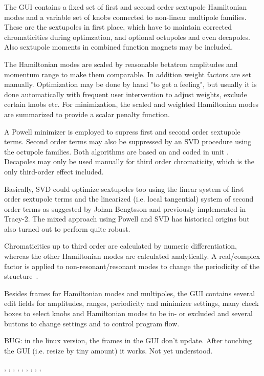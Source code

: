 \documentclass[12pt]{article}
\newcommand\code[1]{{\tt #1}}
\newcommand{\opagui}[1]{\colorbox{blue!20}{{\color{black}\code{#1}}}}
\newcommand{\ogui}[1]{\hyperref[#1]{\opagui{#1}}}
\newcommand{\opaguif}[1]{\colorbox{violet!30}{{\color{black}\code{#1}}}}
\newcommand{\oguif}[1]{\hyperref[#1]{\opaguif{#1}}}
\newcommand{\opauni}[1]{\colorbox{orange!30}{{\color{black}\code{#1}}}}
\newcommand{\ouni}[1]{\hyperref[#1]{\opauni{#1}}}
\newcommand{\uses}[1]{\flushleft {\bf Uses:} #1}
\newcommand{\desc}[1]{#1}
\newcommand{\todo}[1]{{\color{red} #1}}
\begin{document}
\desc{
The GUI contains a fixed set of first and second order sextupole Hamiltonian modes and a variable set of knobs connected to non-linear multipole families. These are the sextupoles in first place, which have to maintain corrected chromaticities during optimzation, and optional octupoles and even decapoles. Also sextupole moments in combined function magnets may be included. 

The Hamiltonian modes are scaled by reasonable  betatron amplitudes and momentum range to make them comparable. In addition weight factors are set manually. Optimization may be done by hand "to get a feeling", but usually it is done automatically with frequent user intervention to adjust weights, exclude certain knobs etc. For minimization, the scaled and weighted Hamiltonian modes are summarized to provide a scalar penalty function.

A Powell minimizer is employed to supress first and second order sextupole terms. Second order terms may also be suppressed by an SVD procedure using the octupole families. Both algorithms are based on \cite{numrec} and coded in unit \ouni{mathlib}. Decapoles may only be used manually for third order chromaticity, which is the only third-order effect included.

\todo{Basically, SVD could optimize sextupoles too using the linear system of first order sextupole terms and the linearized (i.e. local tangential) system of second order terms as suggested by Johan Bengtsson and previously implemented in Tracy-2. The mixed approach using Powell and SVD has historical origins but also turned out to perform quite robust.}

Chromaticities up to third order are calculated by numeric differentiation, whereas the other Hamiltonian modes are calculated analytically. A real/complex factor is applied to non-resonant/resonant modes to change the periodicity of the structure~\cite{inside}. 

Besides frames for Hamiltonian modes and multipoles, the GUI contains several edit fields for amplitudes, ranges, periodicity and minimizer settings, many check boxes to select knobs and Hamiltonian modes to be in- or excluded and several buttons to change settings and to control program flow.


\todo{BUG: in the linux version, the frames in the GUI don't update. After touching the GUI (i.e. resize by tiny amount) it works. Not yet understood.}
}


\uses{
\oguif{chamframe}, \oguif{csexframe}, \ouni{chromreslib}, \ouni{chromelelib},  \ouni{chromlib}, \ogui{ochromsvector}, \ogui{opatunediag}, \ouni{globlib}, \ouni{mathlib}, \ouni{comauxlib}
}
\end{document}
